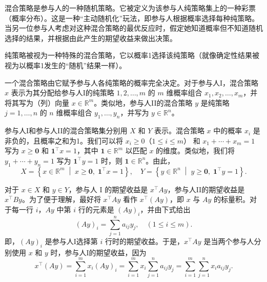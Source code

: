 混合策略是参与人的一种随机策略。它被定义为该参与人纯策略集上的一种彩票（概率分布）。这是一种“主动随机化”玩法，即参与人根据概率选择每种纯策略。当另一位参与人考虑对这种混合策略的最优反应时，假定她知道概率但不知道随机选择的结果，并根据由此产生的期望收益来做出决策。

纯策略被视为一种特殊的混合策略，它以概率1选择该纯策略（就像确定性结果被视为以概率1发生的“随机”结果一样）。

一个混合策略由它赋予参与人各纯策略的概率完全决定。对于参与人I，混合策略 \(x\) 表示为其分配给参与人I的纯策略 \(1,2,\ldots,m\) 的 \(m\) 维概率组合 \({x}_{1},{x}_{2},\ldots,{x}_{m}\)，并将其写为（列）向量 \(x \in  {\mathbb{R}}^{m}\)。类似地，参与人II的混合策略 \(y\) 是纯策略 \(j = 1,\ldots,n\) 的 \(n\) 维概率组合 \({y}_{1},\ldots,{y}_{n}\)，并写为 \(y \in  {\mathbb{R}}^{n}\)。

参与人I和参与人II的混合策略集分别用 \(X\) 和 \(Y\) 表示。混合策略 \(x\) 中的概率 \({x}_{i}\) 是非负的，且概率之和为1。我们可以将 \({x}_{i} \geq  0\)（\(1 \leq  i \leq  m\)） 和 \({x}_{1} + \cdots  + {x}_{m} = 1\) 写为 \(x \geq  \mathbf{0}\) 和 \({\mathbf{1}}^{\top }x = 1\)，其中 \(\mathbf{1} \in  {\mathbb{R}}^{m}\) 以匹配 \(x\) 的维度。类似地，我们将 \({y}_{1} + \cdots  + {y}_{n} = 1\) 写为 \({\mathbf{1}}^{\top }y = 1\) 时，则 \(\mathbf{1} \in  {\mathbb{R}}^{n}\)。由此，
\begin{equation} \label{eq:6.6}
X = \left\{ x \in \mathbb{R}^{m} \;\middle|\; x \geq \mathbf{0},\; \mathbf{1}^{\top}x = 1 \right\}, \quad
Y = \left\{ y \in \mathbb{R}^{n} \;\middle|\; y \geq \mathbf{0},\; \mathbf{1}^{\top}y = 1 \right\} .
\end{equation}

对于 \(x \in  X\) 和 \(y \in  Y\)，参与人 \(\mathrm{I}\) 的期望收益是 \({x}^{\top }{Ay}\)，参与人II的期望收益是 \({x}^{\top }{By}\)。为了便于理解，最好将 \({x}^{\top }{Ay}\) 看作 \({x}^{\top }\left( {Ay}\right)\)，即 \(x\) 与 \({Ay}\) 的标量积。对于每一行 \(i\)，\({Ay}\) 中第 \(i\) 行的元素是 \({\left( Ay\right) }_{i}\)，并由下式给出
\begin{equation} \label{eq:6.7}
{\left( Ay\right) }_{i} = \mathop{\sum }\limits_{{j = 1}}^{n}{a}_{ij}{y}_{j}, \quad (1 \leq  i \leq  m).
\end{equation}
即，\({\left( Ay\right) }_{i}\) 是参与人I选择第 \(i\) 行时的期望收益。于是，\({x}^{\top }{Ay}\) 是当两个参与人分别使用 \(x\) 和 \(y\) 时，参与人I的期望收益，因为
\begin{equation} \label{eq:6.8}
{x}^{\top }\left( {Ay}\right)  = \mathop{\sum }\limits_{{i = 1}}^{m}{x}_{i}{\left( Ay\right) }_{i} = \mathop{\sum }\limits_{{i = 1}}^{m}{x}_{i}\mathop{\sum }\limits_{{j = 1}}^{n}{a}_{ij}{y}_{j} = \mathop{\sum }\limits_{{i = 1}}^{m}\mathop{\sum }\limits_{{j = 1}}^{n}{x}_{i}{a}_{ij}{y}_{j}.
\end{equation}


